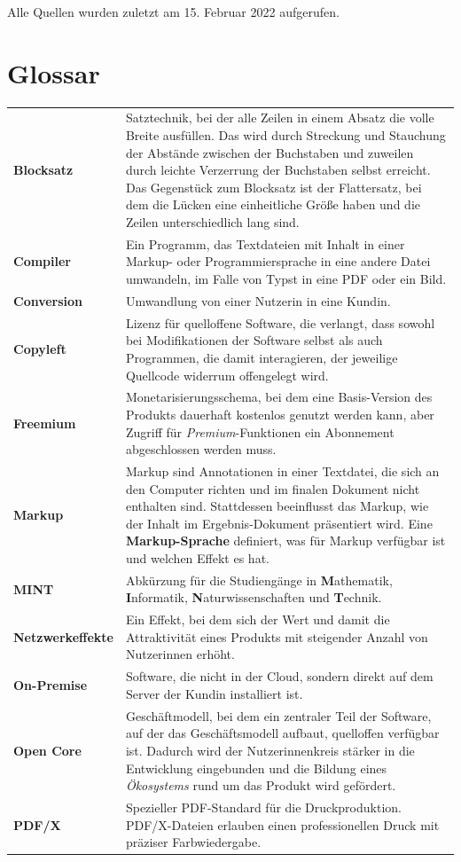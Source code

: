 \documentclass[11pt, a4paper]{article}
\newcommand{\gender}{\raisebox{-.25em}{*}}
\let\oldsection\section
\renewcommand\section{\clearpage\oldsection}
\begin{document}
{\footnotesize Alle Quellen wurden zuletzt am 15. Februar 2022 aufgerufen.}

\section*{Glossar}
\begin{tabular}{l p{}}
\textbf{Blocksatz} & Satztechnik, bei der alle Zeilen in einem Absatz die volle Breite ausfüllen. Das wird durch Streckung und Stauchung der Abstände zwischen der Buchstaben und zuweilen durch leichte Verzerrung der Buchstaben selbst erreicht. Das Gegenstück zum Blocksatz ist der Flattersatz, bei dem die Lücken eine einheitliche Größe haben und die Zeilen unterschiedlich lang sind. \\
\textbf{Compiler} & Ein Programm, das Textdateien mit Inhalt in einer Markup- oder Programmiersprache in eine andere Datei umwandeln, im Falle von Typst in eine PDF oder ein Bild. \\
\textbf{Conversion} & Umwandlung von einer\gender{} Nutzer\gender{}in in eine\gender{} Kund\gender{}in. \\
\textbf{Copyleft} & Lizenz für quelloffene Software, die verlangt, dass sowohl bei Modifikationen der Software selbst als auch Programmen, die damit interagieren, der jeweilige Quellcode widerrum offengelegt wird. \\
\textbf{Freemium} & Monetarisierungsschema, bei dem eine Basis-Version des Produkts dauerhaft kostenlos genutzt werden kann, aber Zugriff für \emph{Premium}-Funktionen ein Abonnement abgeschlossen werden muss. \\
\textbf{Markup} & Markup sind Annotationen in einer Textdatei, die sich an den Computer richten und im finalen Dokument nicht enthalten sind. Stattdessen beeinflusst das Markup, wie der Inhalt im Ergebnis-Dokument präsentiert wird. Eine \textbf{Markup-Sprache} definiert, was für Markup verfügbar ist und welchen Effekt es hat. \\
\textbf{MINT} & Abkürzung für die Studiengänge in \textbf{M}athematik, \textbf{I}nformatik, \textbf{N}aturwissenschaften und \textbf{T}echnik. \\
\textbf{Netzwerkeffekte} & Ein Effekt, bei dem sich der Wert und damit die Attraktivität eines Produkts mit steigender Anzahl von Nutzer\gender{}innen erhöht. \\
\textbf{On-Premise} & Software, die nicht in der Cloud, sondern direkt auf dem Server der\gender{} Kund\gender{}in installiert ist. \\
\textbf{Open Core} & Geschäftmodell, bei dem ein zentraler Teil der Software, auf der das Geschäftsmodell aufbaut, quelloffen verfügbar ist. Dadurch wird der Nutzer\gender{}innenkreis stärker in die Entwicklung eingebunden und die Bildung eines \emph{Ökosystems} rund um das Produkt wird gefördert. \\
\textbf{PDF/X} & Spezieller PDF-Standard für die Druckproduktion. PDF/X-Dateien erlauben einen professionellen Druck mit präziser Farbwiedergabe. \\
\end{tabular}
\end{document}
